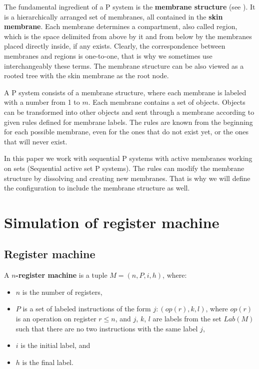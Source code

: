 \documentclass[llncs,submission,copyright,creativecommons]{../lib/lncs/llncs}
\begin{document}

The fundamental ingredient of a P system is the {\bf membrane structure} (see \cite{Paun2006Introduction}). It is a hierarchically arranged set of membranes, all contained in the {\bf skin membrane}. Each membrane determines a compartment, also called region, which is the space delimited from above by it and from below by the membranes placed directly inside, if any exists. Clearly, the correspondence between membranes and regions is one-to-one, that is why we sometimes use interchangeably these terms.
The membrane structure can be also viewed as a rooted tree with the skin membrane as the root node.

A P system consists of a membrane structure, where each membrane is labeled with a number from 1 to $m$. Each membrane contains a set of objects. Objects can be transformed into other objects and sent through a membrane according to given rules defined for membrane labels. The rules are known from the beginning for each possible membrane, even for the ones that do not exist yet, or the ones that will never exist.

In this paper we work with sequential P systems with active membranes working on sets (Sequential active set P systems). The rules can modify the membrane structure by dissolving and creating new membranes. That is why we will define the configuration to include the membrane structure as well.




\section{Simulation of register machine} %
\label{sec:simulation_of_register_machine}

\subsection{Register machine} %
\label{sub:register_machine}

\begin{definition}
  A {\bf $n$-register machine} is a tuple $M = (n,P,i,h)$, where:
  \begin{itemize}
    \item $n$ is the number of registers,
    \item $P$ is a set of labeled instructions of the form $j : (op(r),k,l)$, where $op(r)$ is an operation on register $r\leq n$, and $j$, $k$, $l$ are labels from the set $Lab(M)$ such that there are no two instructions with the same label $j$,
    \item $i$ is the initial label, and
    \item $h$ is the final label.
  \end{itemize}
\end{definition}
\end{document}

